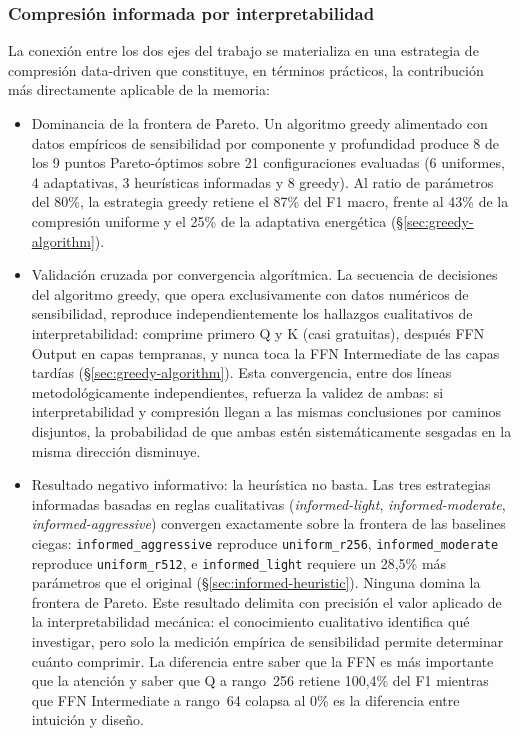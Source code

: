 \subsubsection{Compresión informada por interpretabilidad}

La conexión entre los dos ejes del trabajo se materializa en una estrategia
de compresión data-driven que constituye, en términos prácticos, la
contribución más directamente aplicable de la memoria:

\begin{itemize}
  \item Dominancia de la frontera de Pareto. Un algoritmo greedy
        alimentado con datos empíricos de sensibilidad por componente y
        profundidad produce 8 de los 9 puntos Pareto-óptimos sobre 21
        configuraciones evaluadas (6 uniformes, 4 adaptativas, 3 heurísticas
        informadas y 8 greedy). Al ratio de parámetros del 80\%, la
        estrategia greedy retiene el 87\% del F1 macro, frente al 43\% de
        la compresión uniforme y el 25\% de la adaptativa energética
        (\S\ref{sec:greedy-algorithm}).

  \item Validación cruzada por convergencia algorítmica. La
        secuencia de decisiones del algoritmo greedy, que opera
        exclusivamente con datos numéricos de sensibilidad, reproduce
        independientemente los hallazgos cualitativos de interpretabilidad:
        comprime primero Q y K (casi gratuitas), después FFN Output en
        capas tempranas, y nunca toca la FFN Intermediate de las capas
        tardías (\S\ref{sec:greedy-algorithm}). Esta convergencia, entre dos
        líneas metodológicamente independientes, refuerza la validez de
        ambas: si interpretabilidad y compresión llegan a las mismas
        conclusiones por caminos disjuntos, la probabilidad de que ambas
        estén sistemáticamente sesgadas en la misma dirección disminuye.

  \item Resultado negativo informativo: la heurística no basta.
        Las tres estrategias informadas basadas en reglas cualitativas
        (\textit{informed-light}, \textit{informed-moderate},
        \textit{informed-aggressive}) convergen exactamente sobre la
        frontera de las baselines ciegas: \texttt{informed\_aggressive}
        reproduce \texttt{uniform\_r256}, \texttt{informed\_moderate}
        reproduce \texttt{uniform\_r512}, e \texttt{informed\_light}
        requiere un 28{,}5\% más parámetros que el original
        (\S\ref{sec:informed-heuristic}). Ninguna domina la frontera de
        Pareto. Este resultado delimita con precisión el valor aplicado
        de la interpretabilidad mecánica: el conocimiento cualitativo
        identifica qué investigar, pero solo la medición empírica de
        sensibilidad permite determinar cuánto comprimir. La diferencia
        entre saber que la FFN es más importante que la atención y saber
        que Q a rango~256 retiene 100{,}4\% del F1 mientras que FFN
        Intermediate a rango~64 colapsa al 0\% es la diferencia entre
        intuición y diseño.


\end{itemize}
